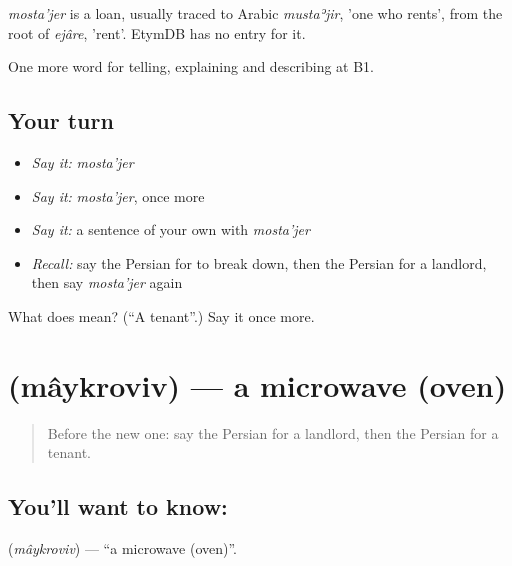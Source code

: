 \begin{cousinweb}
\emph{mosta'jer} is a loan, usually traced to Arabic \emph{mustaʾjir}, 'one who rents', from the root of \emph{ejâre}, 'rent'. EtymDB has no entry for it.
\end{cousinweb}

\begin{grammarlens}[title={What you've built}]
One more word for telling, explaining and describing at B1.
\end{grammarlens}

\subsection*{Your turn}
\begin{itemize}
\raggedright
  \item \emph{Say it:} \emph{mosta'jer}
  \item \emph{Say it:} \emph{mosta'jer}, once more
  \item \emph{Say it:} a sentence of your own with \emph{mosta'jer}
  \item \emph{Recall:} say the Persian for to break down, then the Persian for a landlord, then say \emph{mosta'jer} again
\end{itemize}

\begin{tcolorbox}[breakable,colback=teal!4,colframe=teal!35!black,title={Before you move on}]
What does  mean? (\textquotedblleft{}A tenant\textquotedblright{}.) Say it once more.
\end{tcolorbox}
\section[\texorpdfstring{\fa{مایکروویو} (mâykroviv)}{مایکروویو (mâykroviv)}]{ (mâykroviv) — a microwave (oven)}

\label{lesson:FA-C538-maykroviv}



\begin{quote}
Before the new one: say the Persian for a landlord, then the Persian for a tenant.
\end{quote}

\subsection*{You'll want to know: }
\textbf{} (\emph{mâykroviv}) — \textquotedblleft{}a microwave (oven)\textquotedblright{}.

